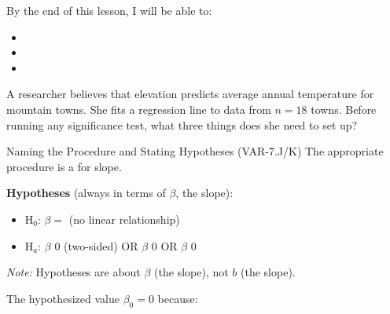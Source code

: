 \documentclass[10pt]{article}
\begin{document}
\namedateperiod

\begin{objectivebox}
By the end of this lesson, I will be able to:
\begin{itemize}
    \item[$\square$] \writeline
    \item[$\square$] \writeline
    \item[$\square$] \writeline
\end{itemize}
\end{objectivebox}

\begin{vocabbox}
\end{vocabbox}

\begin{hookbox}
A researcher believes that elevation predicts average annual temperature for mountain
towns. She fits a regression line to data from $n = 18$ towns. Before running any
significance test, what three things does she need to set up?

\end{hookbox}

\begin{notesbox}{Naming the Procedure and Stating Hypotheses (VAR-7.J/K)}
The appropriate procedure is a  for slope.

\vspace{0.1in}
\textbf{Hypotheses} (always in terms of $\beta$, the  slope):

\begin{itemize}
    \item H$_0$: $\beta = $  \quad (no linear relationship)
    \item H$_a$: $\beta$ \ans{$\ne$} 0 \; (two-sided) \quad OR \quad
          $\beta$ \ans{$>$} 0 \quad OR \quad $\beta$ \ans{$<$} 0
\end{itemize}

\vspace{0.05in}
\textit{Note:} Hypotheses are about $\beta$ (the  slope),
not $b$ (the  slope).

\vspace{0.05in}
The hypothesized value $\beta_0 = 0$ because: 
\end{notesbox}
\end{document}
